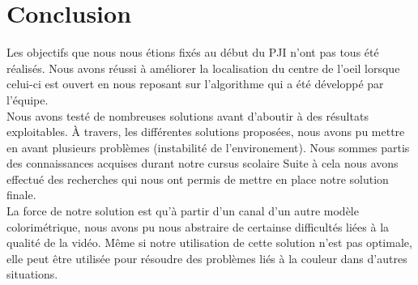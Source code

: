\section{Conclusion}


Les objectifs que nous nous étions fixés au début du PJI n'ont pas tous été réalisés. Nous avons réussi à
améliorer la localisation du centre de l'oeil lorsque celui-ci est ouvert en nous reposant sur 
l'algorithme qui a été développé par l'équipe.\\

Nous avons testé de nombreuses solutions avant d'aboutir à des résultats exploitables. À travers, les différentes 
solutions proposées, nous avons pu mettre en avant plusieurs problèmes (instabilité de l'environement).
Nous sommes partis des connaissances acquises durant notre cursus scolaire 
Suite à cela nous avons effectué des recherches qui nous ont permis de mettre en place 
notre solution finale.\\


La force de notre solution est qu'à partir d'un canal d'un autre modèle colorimétrique, nous avons pu 
nous abstraire de certainse difficultés liées à la qualité de la vidéo. Même si notre utilisation de cette
solution n'est pas optimale, elle peut être utilisée pour résoudre des problèmes liés à la couleur dans d'autres situations.\\

